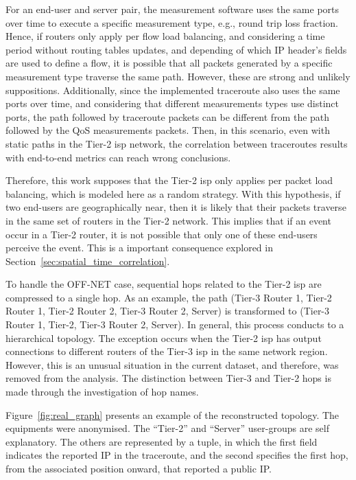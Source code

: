 For an end-user and server pair,
the measurement software uses the same ports over time to execute a specific
measurement type, e.g., round trip loss fraction.
Hence, if routers only apply per flow load balancing,
and considering a time period without routing tables updates, and
depending of which IP header's fields are used to define a flow, it is possible
that all packets generated by a specific measurement type traverse the same
path. However, these are strong and unlikely suppositions.
Additionally, since the implemented traceroute also uses the same ports over
time, and considering that different measurements types use distinct ports,
the
path followed by traceroute packets can be different from the path followed by
the QoS measurements packets. Then, in this scenario, even with static paths in
the Tier-2 \gls*{isp} network, the correlation between traceroutes
results with end-to-end metrics can reach wrong conclusions.

Therefore, this work supposes that the Tier-2 \gls*{isp} only applies per packet load
balancing, which is modeled here as a random strategy. With this hypothesis,
if two end-users are geographically near, then it is likely that their packets
traverse in the same set of routers in the Tier-2 network. This implies that if
an event occur in a Tier-2 router, it is not possible that only one of these
end-users perceive the event. This is a important consequence explored in
Section~\ref{sec:spatial_time_correlation}.

To handle the OFF-NET case, sequential hops related to
the Tier-2 \gls*{isp} are compressed to a single hop.
As an example, the path (Tier-3 Router 1, Tier-2 Router 1, Tier-2 Router 2,
Tier-3 Router 2, Server) is
transformed to (Tier-3 Router 1, Tier-2, Tier-3 Router 2, Server).
In general, this process conducts to a hierarchical topology.
The exception occurs when the Tier-2 \gls*{isp} has output connections to
different routers of the Tier-3 \gls*{isp} in the same network region.
However, this is an unusual situation in
the current dataset, and therefore, was removed from the analysis.
The distinction between
Tier-3 and Tier-2 hops is made through the investigation of hop names.

Figure~\ref{fig:real_graph} presents an example of the reconstructed
topology. The equipments were anonymised. The ``Tier-2'' and ``Server''
user-groups are self explanatory. The others are represented by a tuple, in
which the first field indicates the reported IP in the traceroute, and the
second specifies the first hop, from the associated position onward,
that reported a public IP\@.


